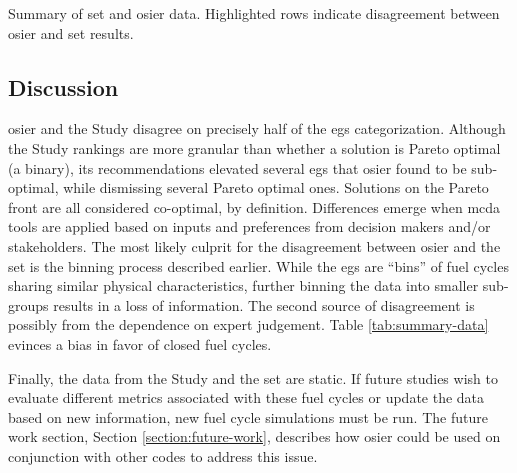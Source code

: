 \begin{table}[htbp!]
    \centering
    \caption{Summary of \ac{set} and \ac{osier} data. Highlighted rows indicate
    disagreement between \ac{osier} and \ac{set} results.}
    \label{tab:summary-data}
    \resizebox*{0.75\textwidth}{!}{}
\end{table}

\FloatBarrier

\subsection{Discussion}

\ac{osier} and the Study disagree on precisely half of the \acp{eg} categorization. Although the
Study rankings are more granular than whether a solution is Pareto optimal (a binary), its recommendations
elevated several \acp{eg} that \ac{osier} found to be sub-optimal, while dismissing several Pareto optimal
ones. Solutions on the Pareto front are all considered co-optimal, by definition. Differences emerge when 
\ac{mcda} tools are applied based on inputs and preferences from decision makers and/or stakeholders.
The most likely culprit for the disagreement between \ac{osier} and the \ac{set} is the binning process
described earlier. While the \acp{eg} are ``bins'' of fuel cycles sharing similar physical characteristics,
further binning the data into smaller sub-groups results in a loss of information. The second source of disagreement
is possibly from the dependence on expert judgement. Table \ref{tab:summary-data} evinces a bias in favor of closed
fuel cycles.

Finally, the data from the Study and the \ac{set} are static. If future studies wish to evaluate different metrics
associated with these fuel cycles or update the data based on new information, new fuel cycle simulations must be run.
The future work section, Section \ref{section:future-work}, describes how \ac{osier} could be used on conjunction
with other codes to address this issue. 